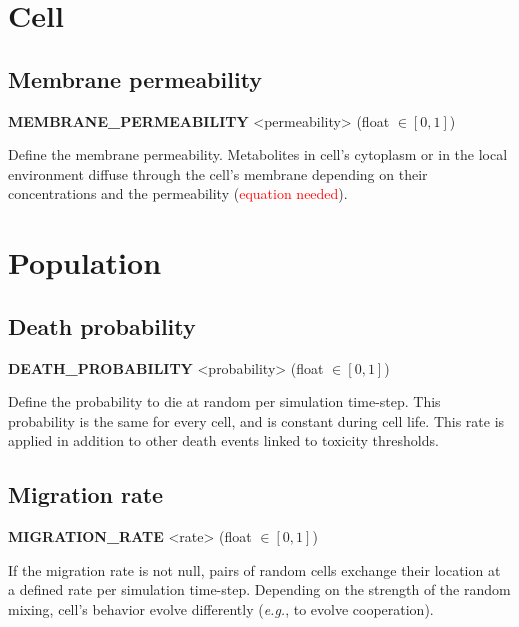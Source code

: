 
\section{Cell}

\subsection{Membrane permeability}
\begin{center}
{\bf MEMBRANE\_PERMEABILITY} <permeability> (float $\in [0, 1]$)
\end{center}
Define the membrane permeability. Metabolites in cell's cytoplasm or in the local environment diffuse through the cell's membrane depending on their concentrations and the permeability (\textcolor{red}{equation needed}).


\section{Population}

\subsection{Death probability}
\begin{center}
{\bf DEATH\_PROBABILITY} <probability> (float $\in [0, 1]$)
\end{center}
Define the probability to die at random per simulation time-step. This probability is the same for every cell, and is constant during cell life. This rate is applied in addition to other death events linked to toxicity thresholds.


\subsection{Migration rate}
\begin{center}
{\bf MIGRATION\_RATE} <rate> (float $\in [0, 1]$)
\end{center}
If the migration rate is not null, pairs of random cells exchange their location at a defined rate per simulation time-step. Depending on the strength of the random mixing, cell's behavior evolve differently (\textit{e.g.}, to evolve cooperation).


